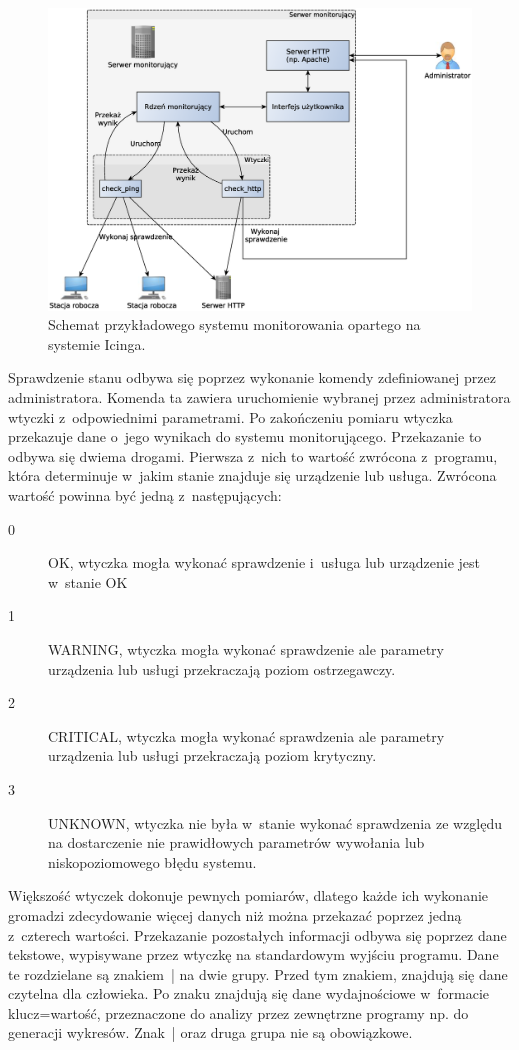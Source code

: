 \begin{figure}[ht]
  \caption{Schemat przykładowego systemu monitorowania opartego na
    systemie Icinga.}
  \label{fig:schematIcingi}
\includegraphics[width=1\textwidth]{img/schematIcingi}
\end{figure}


Sprawdzenie stanu odbywa się poprzez wykonanie komendy zdefiniowanej
przez administratora. Komenda ta zawiera uruchomienie wybranej przez
administratora wtyczki z~odpowiednimi parametrami. Po zakończeniu
pomiaru wtyczka przekazuje dane o~jego wynikach do systemu
monitorującego. Przekazanie to odbywa się dwiema drogami. Pierwsza
z~nich to wartość zwrócona z~programu, która determinuje w~jakim
stanie znajduje się urządzenie lub usługa. Zwrócona wartość powinna
być jedną z~następujących:

\begin{description}
\item[0] OK, wtyczka mogła wykonać sprawdzenie i~usługa lub urządzenie
  jest w~stanie OK
\item[1] WARNING, wtyczka mogła wykonać sprawdzenie ale parametry
  urządzenia lub usługi przekraczają poziom ostrzegawczy.
\item[2] CRITICAL, wtyczka mogła wykonać sprawdzenia ale parametry
  urządzenia lub usługi przekraczają poziom krytyczny.
\item[3] UNKNOWN, wtyczka nie była w~stanie wykonać sprawdzenia ze
  względu na dostarczenie nie prawidłowych parametrów wywołania lub
  niskopoziomowego błędu systemu.
\end{description}


Większość wtyczek dokonuje pewnych pomiarów, dlatego każde ich
wykonanie gromadzi zdecydowanie więcej danych niż można przekazać
poprzez jedną z~czterech wartości. Przekazanie pozostałych informacji
odbywa się poprzez dane tekstowe, wypisywane przez wtyczkę na
standardowym wyjściu programu. Dane te rozdzielane są znakiem~| na dwie
grupy. Przed tym znakiem, znajdują się dane czytelna dla człowieka. Po
znaku znajdują się dane wydajnościowe w~formacie klucz=wartość,
przeznaczone do analizy przez zewnętrzne programy np. do generacji
wykresów. Znak~| oraz druga grupa nie są obowiązkowe.

